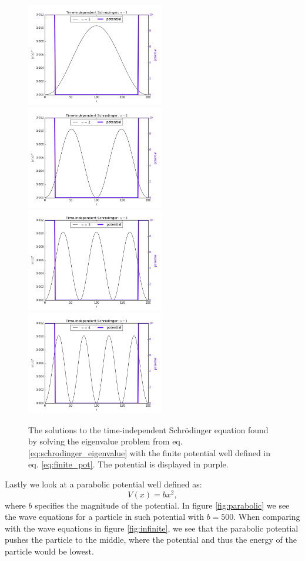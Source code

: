 \documentclass[a4paper]{article}
\begin{document}
\begin{figure}
\centering
\includegraphics[width=6cm]{finite_scaled_1}
\includegraphics[width=6cm]{finite_scaled_2}
\includegraphics[width=6cm]{finite_scaled_3}
\includegraphics[width=6cm]{finite_scaled_4}
\caption{The solutions to the time-independent Schr\"odinger equation found by solving the eigenvalue problem from eq. \ref{eq:schrodinger_eigenvalue} with the finite potential well defined in eq. \ref{eq:finite_pot}. The potential is displayed in purple.}
\label{fig:finite}
\end{figure}

Lastly we look at a parabolic potential well defined as:
\begin{equation} \label{eq:finite_pot}
    V(x) = bx^2,
\end{equation}
where $b$ specifies the magnitude of the potential. In figure \ref{fig:parabolic} we see the wave equations for a particle in such potential with $b=500$. When comparing with the wave equations in figure \ref{fig:infinite}, we see that the parabolic potential pushes the particle to the middle, where the potential and thus the energy of the particle would be lowest.
\end{document}
